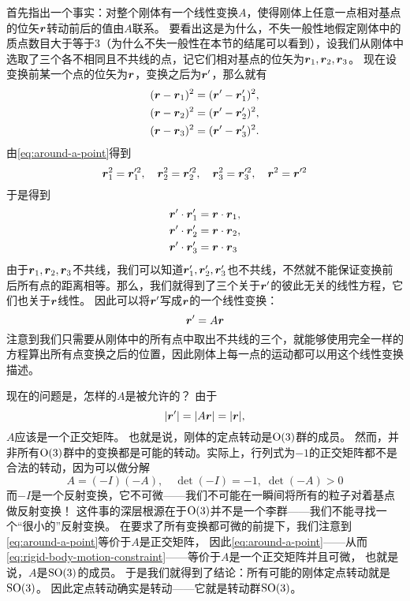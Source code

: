 首先指出一个事实：对整个刚体有一个线性变换$A$，使得刚体上任意一点相对基点的位矢$\vb*{r}$转动前后的值由$A$联系。
要看出这是为什么，不失一般性地假定刚体中的质点数目大于等于3（为什么不失一般性在本节的结尾可以看到），设我们从刚体中选取了三个各不相同且不共线的点，记它们相对基点的位矢为$\vb*{r}_1, \vb*{r}_2, \vb*{r}_3$。
现在设变换前某一个点的位矢为$\vb*{r}$，变换之后为$\vb*{r}'$，那么就有
\[
    \begin{aligned}
        (\vb*{r} - \vb*{r}_1)^2 &= (\vb*{r}' - \vb*{r}_1')^2, \\
        (\vb*{r} - \vb*{r}_2)^2 &= (\vb*{r}' - \vb*{r}_2')^2, \\
        (\vb*{r} - \vb*{r}_3)^2 &= (\vb*{r}' - \vb*{r}_3')^2.
    \end{aligned}
\]
由\eqref{eq:around-a-point}得到
\[
    \vb*{r}_1^2 = \vb*{r}_1'^2, \quad \vb*{r}_2^2 = \vb*{r}_2'^2, \quad \vb*{r}_3^2 = \vb*{r}_3'^2, \quad \vb*{r}^2 = \vb*{r}'^2
\]
于是得到
\[
    \begin{aligned}
        \vb*{r}' \cdot \vb*{r}_1' &= \vb*{r} \cdot \vb*{r}_1, \\
        \vb*{r}' \cdot \vb*{r}_2' &= \vb*{r} \cdot \vb*{r}_2, \\
        \vb*{r}' \cdot \vb*{r}_3' &= \vb*{r} \cdot \vb*{r}_3
    \end{aligned} 
\]
由于$\vb*{r}_1, \vb*{r}_2, \vb*{r}_3$不共线，我们可以知道$\vb*{r}'_1, \vb*{r}'_2, \vb*{r}'_3$也不共线，不然就不能保证变换前后所有点的距离相等。那么，我们就得到了三个关于$\vb*{r}'$的彼此无关的线性方程，它们也关于$\vb*{r}$线性。
因此可以将$\vb*{r}'$写成$\vb*{r}$的一个线性变换：
\[
    \vb*{r}' = A \vb*{r}
\]
注意到我们只需要从刚体中的所有点中取出不共线的三个，就能够使用完全一样的方程算出所有点变换之后的位置，因此刚体上每一点的运动都可以用这个线性变换描述。

现在的问题是，怎样的$A$是被允许的？
由于
\[
    \abs{\vb*{r}'} = \abs{A \vb*{r}} = \abs{\vb*{r}},
\]
$A$应该是一个正交矩阵。
也就是说，刚体的定点转动是$\mathrm{O}(3)$群的成员。
然而，并非所有$\mathrm{O}(3)$群中的变换都是可能的转动。实际上，行列式为$-1$的正交矩阵都不是合法的转动，因为可以做分解
\[
    A = (-I) (-A), \quad \det (-I) = -1, \; \det (-A) > 0
\]
而$-I$是一个反射变换，它不可微——我们不可能在一瞬间将所有的粒子对着基点做反射变换！
这件事的深层根源在于$\mathrm{O}(3)$并不是一个李群——我们不能寻找一个“很小的”反射变换。
在要求了所有变换都可微的前提下，我们注意到\eqref{eq:around-a-point}等价于$A$是正交矩阵，
因此\eqref{eq:around-a-point}——从而\eqref{eq:rigid-body-motion-constraint}——等价于$A$是一个正交矩阵并且可微，
也就是说，$A$是$\mathrm{SO}(3)$的成员。
于是我们就得到了结论：所有可能的刚体定点转动就是$\mathrm{SO}(3)$。
因此定点转动确实是转动——它就是转动群$\mathrm{SO}(3)$。

